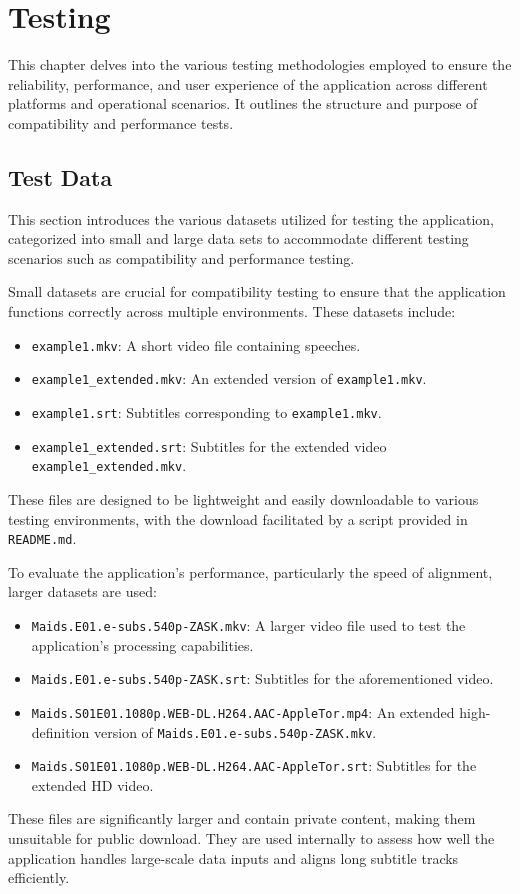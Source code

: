 \chapter{Testing}

This chapter delves into the various testing methodologies employed to ensure the reliability, performance, and user experience of the application across different platforms and operational scenarios. It outlines the structure and purpose of compatibility and performance tests. 
\section{Test Data}

This section introduces the various datasets utilized for testing the application, categorized into small and large data sets to accommodate different testing scenarios such as compatibility and performance testing.

Small datasets are crucial for compatibility testing to ensure that the application functions correctly across multiple environments. These datasets include:
\begin{itemize}
\item \texttt{example1.mkv}: A short video file containing speeches.
\item \texttt{example1\_extended.mkv}: An extended version of \texttt{example1.mkv}.
\item \texttt{example1.srt}: Subtitles corresponding to \texttt{example1.mkv}.
\item \texttt{example1\_extended.srt}: Subtitles for the extended video \texttt{example1\_extended.mkv}.
\end{itemize}
These files are designed to be lightweight and easily downloadable to various testing environments, with the download facilitated by a script provided in \texttt{README.md}.

To evaluate the application's performance, particularly the speed of alignment, larger datasets are used:
\begin{itemize}
\item \texttt{Maids.E01.e-subs.540p-ZASK.mkv}: A larger video file used to test the application's processing capabilities.
\item \texttt{Maids.E01.e-subs.540p-ZASK.srt}: Subtitles for the aforementioned video.
\item \texttt{Maids.S01E01.1080p.WEB-DL.H264.AAC-AppleTor.mp4}: An extended high-definition version of \texttt{Maids.E01.e-subs.540p-ZASK.mkv}.
\item \texttt{Maids.S01E01.1080p.WEB-DL.H264.AAC-AppleTor.srt}: Subtitles for the extended HD video.
\end{itemize}
These files are significantly larger and contain private content, making them unsuitable for public download. They are used internally to assess how well the application handles large-scale data inputs and aligns long subtitle tracks efficiently.

